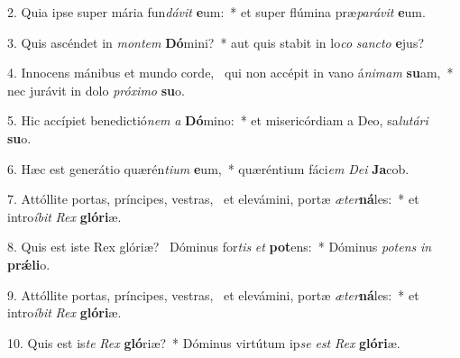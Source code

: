 2. Quia ipse super mária fun\textit{dá}\textit{vit} \textbf{e}um:~*  et super flúmina præ\textit{pa}\textit{rá}\textit{vit} \textbf{e}um.\

3. Quis ascéndet in \textit{mon}\textit{tem} \textbf{Dó}mini?~*  aut quis stabit in lo\textit{co} \textit{sanc}\textit{to} \textbf{e}jus?\

4. Innocens mánibus et mundo corde, \dag\  qui non accépit in vano á\textit{ni}\textit{mam} \textbf{su}am,~*  nec jurávit in dolo \textit{pró}\textit{xi}\textit{mo} \textbf{su}o.\

5. Hic accípiet benedictió\textit{nem} \textit{a} \textbf{Dó}mino:~*  et misericórdiam a Deo, sa\textit{lu}\textit{tá}\textit{ri} \textbf{su}o.\

6. Hæc est generátio quærén\textit{ti}\textit{um} \textbf{e}um,~*  quæréntium fáci\textit{em} \textit{De}\textit{i} \textbf{Ja}cob.\

7. Attóllite portas, príncipes, vestras, \dag\  et elevámini, portæ \textit{æ}\textit{ter}\textbf{ná}les:~*  et intro\textit{í}\textit{bit} \textit{Rex} \textbf{gló}\textbf{ri}æ.\

8. Quis est iste Rex glóriæ? \dag\  Dóminus for\textit{tis} \textit{et} \textbf{pot}ens:~*  Dóminus \textit{pot}\textit{ens} \textit{in} \textbf{prǽ}\textbf{li}o.\

9. Attóllite portas, príncipes, vestras, \dag\  et elevámini, portæ \textit{æ}\textit{ter}\textbf{ná}les:~*  et intro\textit{í}\textit{bit} \textit{Rex} \textbf{gló}\textbf{ri}æ.\

10. Quis est is\textit{te} \textit{Rex} \textbf{gló}riæ?~*  Dóminus virtútum ip\textit{se} \textit{est} \textit{Rex} \textbf{gló}\textbf{ri}æ.\

